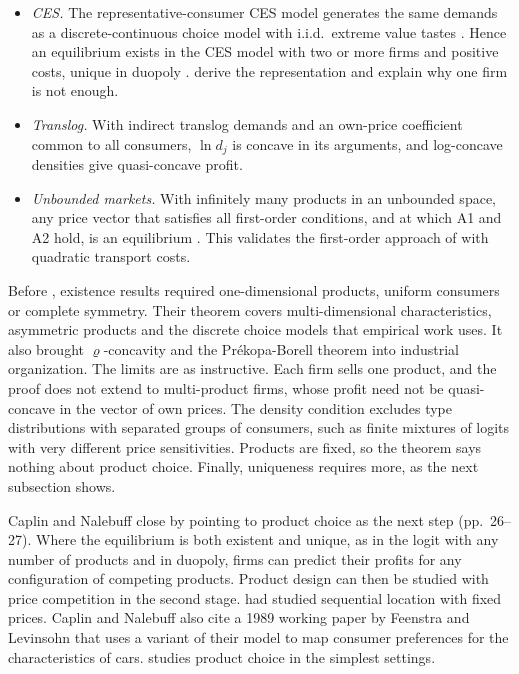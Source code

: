 \begin{itemize}
  demand is log-concave in $\ln p_j$, and \cref{lem:04-loglog} gives quasi-concave profit. Cobb-Douglas
  preferences satisfy these conditions, and an equilibrium exists with two or more firms and positive costs, unique
  in duopoly.
  \item \emph{CES.} The representative-consumer CES model generates the same demands as a discrete-continuous choice
  model with i.i.d.\ extreme value tastes \citep[eq.~(8.3)]{CaplinNalebuff1991}. Hence an equilibrium exists in the
  CES model with two or more firms and positive costs, unique in duopoly \citep[Proposition 14]{CaplinNalebuff1991}.
   derive the representation and explain why one firm is not enough.
  \item \emph{Translog.} With indirect translog demands and an own-price coefficient common to all consumers,
  $\ln d_j$ is concave in its arguments, and log-concave densities give quasi-concave profit.
  \item \emph{Unbounded markets.} With infinitely many products in an unbounded space, any price vector that
  satisfies all first-order conditions, and at which A1 and A2 hold, is an equilibrium
  \citep[Proposition 15]{CaplinNalebuff1991}.
  This validates the first-order approach of \citet{Stiglitz1986} with quadratic transport costs.
\end{itemize}

Before \citet{CaplinNalebuff1991}, existence results required one-dimensional products, uniform consumers or
complete symmetry. Their theorem covers multi-dimensional characteristics, asymmetric products and the discrete
choice models that empirical work uses. It also brought $\varrho$-concavity and the Pr\'ekopa-Borell theorem into
industrial organization. The limits are as instructive. Each firm sells one product, and the proof does not extend
to multi-product firms, whose profit need not be quasi-concave in the vector of own prices. The density condition
excludes type distributions with separated groups of consumers, such as finite mixtures of logits with very
different price sensitivities. Products are fixed, so the theorem says nothing about product choice. Finally,
uniqueness requires more, as the next subsection shows.

Caplin and Nalebuff close by pointing to product choice as the next step (pp.~26--27). Where the equilibrium is
both existent and unique, as in the logit with any number of products and in duopoly, firms can predict their
profits for any configuration of competing products. Product design can then be studied with price competition in
the second stage. \citet{PrescottVisscher1977} had studied sequential location with fixed prices. Caplin and
Nalebuff also cite a 1989 working paper by Feenstra and Levinsohn that uses a variant of their model to map
consumer preferences for the characteristics of cars.  studies product choice in the
simplest settings.


